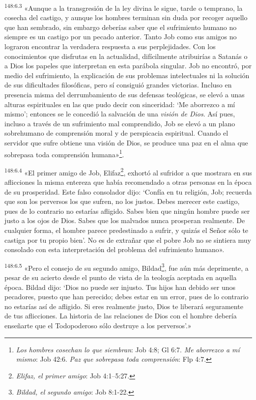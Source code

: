 \par
\textsuperscript{148:6.3} «Aunque a la transgresión de la ley divina le sigue, tarde o temprano, la cosecha del castigo, y aunque los hombres terminan sin duda por recoger aquello que han sembrado, sin embargo deberías saber que el sufrimiento humano no siempre es un castigo por un pecado anterior. Tanto Job como sus amigos no lograron encontrar la verdadera respuesta a sus perplejidades. Con los conocimientos que disfrutas en la actualidad, difícilmente atribuirías a Satanás o a Dios los papeles que interpretan en esta parábola singular. Job no encontró, por medio del sufrimiento, la explicación de sus problemas intelectuales ni la solución de sus dificultades filosóficas, pero sí consiguió grandes victorias. Incluso en presencia misma del derrumbamiento de sus defensas teológicas, se elevó a unas alturas espirituales en las que pudo decir con sinceridad: `Me aborrezco a mí mismo'; entonces se le concedió la salvación de una \textit{visión de Dios}. Así pues, incluso a través de un sufrimiento mal comprendido, Job se elevó a un plano sobrehumano de comprensión moral y de perspicacia espiritual. Cuando el servidor que sufre obtiene una visión de Dios, se produce una paz en el alma que sobrepasa toda comprensión humana»\footnote{\textit{Los hombres cosechan lo que siembran}: Job 4:8; Gl 6:7. \textit{Me aborrezco a mí mismo}: Job 42:6. \textit{Paz que sobrepasa toda comprensión}: Flp 4:7.}.

\par
\textsuperscript{148:6.4} «El primer amigo de Job, Elifaz\footnote{\textit{Elifaz, el primer amigo}: Job 4:1--5:27.}, exhortó al sufridor a que mostrara en sus aflicciones la misma entereza que había recomendado a otras personas en la época de su prosperidad. Este falso consolador dijo: `Confía en tu religión, Job; recuerda que son los perversos los que sufren, no los justos. Debes merecer este castigo, pues de lo contrario no estarías afligido. Sabes bien que ningún hombre puede ser justo a los ojos de Dios. Sabes que los malvados nunca prosperan realmente. De cualquier forma, el hombre parece predestinado a sufrir, y quizás el Señor sólo te castiga por tu propio bien'. No es de extrañar que el pobre Job no se sintiera muy consolado con esta interpretación del problema del sufrimiento humano».

\par
\textsuperscript{148:6.5} «Pero el consejo de su segundo amigo, Bildad\footnote{\textit{Bildad, el segundo amigo}: Job 8:1-22.}, fue aún más deprimente, a pesar de su acierto desde el punto de vista de la teología aceptada en aquella época. Bildad dijo: `Dios no puede ser injusto. Tus hijos han debido ser unos pecadores, puesto que han perecido; debes estar en un error, pues de lo contrario no estarías así de afligido. Si eres realmente justo, Dios te liberará seguramente de tus aflicciones. La historia de las relaciones de Dios con el hombre debería enseñarte que el Todopoderoso sólo destruye a los perversos'.»

